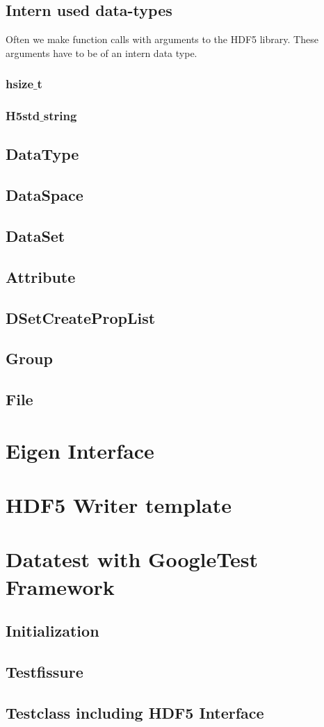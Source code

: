 \documentclass{article}
\begin{document}
\subsection{Intern used data-types}
Often we make function calls with arguments to the HDF5 library. These arguments have to be of an intern data type. 
\subsubsection{hsize$\_$t}
\subsubsection{H5std$\_$string}
\subsection{DataType}
\subsection{DataSpace}
\subsection{DataSet}
\subsection{Attribute}
\subsection{DSetCreatePropList}
\subsection{Group}
\subsection{File}

\section{Eigen Interface}

\section{HDF5 Writer template}

\section{Datatest with GoogleTest Framework}
\subsection{Initialization}
\subsection{Testfissure}
\subsection{Testclass including HDF5 Interface}






\end{document}
